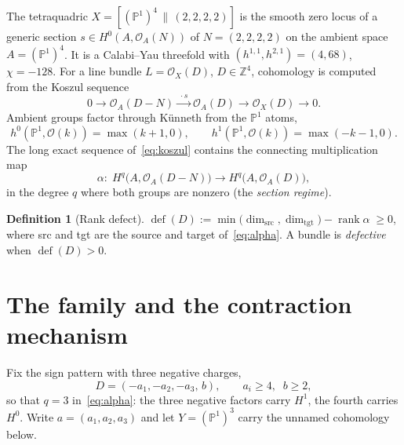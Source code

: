\documentclass[11pt]{article}
\theoremstyle{plain}
\theoremstyle{definition}
\newtheorem{definition}[theorem]{Definition}
\theoremstyle{remark}
\newcommand{\PP}{\mathbb{P}}
\newcommand{\cO}{\mathcal{O}}
\newcommand{\rank}{\operatorname{rank}}
\newcommand{\defect}{\operatorname{def}}
\begin{document}
The tetraquadric $X=[(\PP^1)^4\,\|\,(2,2,2,2)]$ is the smooth zero locus of a generic section $s\in H^0(A,\cO_A(N))$ of $N=(2,2,2,2)$ on the ambient space $A=(\PP^1)^4$. It is a Calabi--Yau threefold with $(h^{1,1},h^{2,1})=(4,68)$, $\chi=-128$. For a line bundle $L=\cO_X(D)$, $D\in\mathbb{Z}^4$, cohomology is computed from the Koszul sequence
\begin{equation}\label{eq:koszul}
0\longrightarrow \cO_A(D-N)\xrightarrow{\;\cdot s\;}\cO_A(D)\longrightarrow \cO_X(D)\longrightarrow 0 .
\end{equation}
Ambient groups factor through K\"unneth from the $\PP^1$ atoms,
\begin{equation}\label{eq:p1}
h^0(\PP^1,\cO(k))=\max(k+1,0),\qquad
h^1(\PP^1,\cO(k))=\max(-k-1,0).
\end{equation}
The long exact sequence of~\eqref{eq:koszul} contains the connecting multiplication map
\begin{equation}\label{eq:alpha}
\alpha:\;H^q\!\big(A,\cO_A(D-N)\big)\longrightarrow H^q\!\big(A,\cO_A(D)\big),
\end{equation}
in the degree $q$ where both groups are nonzero (the \emph{section regime}).

\begin{definition}[Rank defect]
$\defect(D):=\min\!\big(\dim_{\mathrm{src}},\dim_{\mathrm{tgt}}\big)-\rank\alpha\;\ge 0$, where src and tgt are the source and target of~\eqref{eq:alpha}. A bundle is \emph{defective} when $\defect(D)>0$.
\end{definition}

\section{The family and the contraction mechanism}\label{sec:mech}

Fix the sign pattern with three negative charges,
\[
D=(-a_1,-a_2,-a_3,\,b),\qquad a_i\ge 4,\;\; b\ge 2,
\]
so that $q=3$ in~\eqref{eq:alpha}: the three negative factors carry $H^1$, the fourth carries $H^0$. Write $a=(a_1,a_2,a_3)$ and let $Y=(\PP^1)^3$ carry the unnamed cohomology below.
\end{document}
